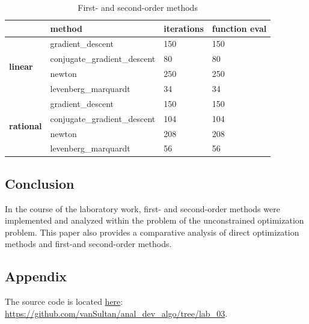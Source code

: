 \begin{table}[ht]
\caption{First- and second-order methods}
\begin{tabular}{l|l|l|l|}
\cline{2-4}
                                                         & \textbf{method}              & \textbf{iterations} & \textbf{function eval} \\ \hline
\multicolumn{1}{|l|}{\multirow{4}{*}{\textbf{linear}}}   & gradient\_descent            & 150                 & 150                    \\ \cline{2-4}
\multicolumn{1}{|l|}{}                                   & conjugate\_gradient\_descent & 80                  & 80                     \\ \cline{2-4}
\multicolumn{1}{|l|}{}                                   & newton                       & 250                 & 250                    \\ \cline{2-4}
\multicolumn{1}{|l|}{}                                   & levenberg\_marquardt         & 34                  & 34                     \\ \hline
\multicolumn{1}{|l|}{\multirow{4}{*}{\textbf{rational}}} & gradient\_descent            & 150                 & 150                    \\ \cline{2-4}
\multicolumn{1}{|l|}{}                                   & conjugate\_gradient\_descent & 104                 & 104                    \\ \cline{2-4}
\multicolumn{1}{|l|}{}                                   & newton                       & 208                 & 208                    \\ \cline{2-4}
\multicolumn{1}{|l|}{}                                   & levenberg\_marquardt         & 56                  & 56                     \\ \hline
\end{tabular}
\label{tbl:order}
\end{table}

\subsection{Conclusion}\label{subsec:conclusion}

In the course of the laboratory work,  first- and second-order methods were implemented and analyzed within the problem of the unconstrained optimization problem.
This paper also provides a comparative analysis of direct optimization methods and first-and second-order methods.

\subsection{Appendix}\label{subsec:appendix}

The source code is located \href{https://github.com/vanSultan/anal_dev_algo/tree/lab_03}{here}: \url{https://github.com/vanSultan/anal_dev_algo/tree/lab_03}.
